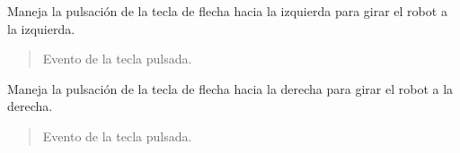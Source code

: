 \documentclass[a4paper,10pt,spanish]{sphinxmanual}
\begin{document}
\begin{fulllineitems}
\begin{fulllineitems}
\begin{quote}
\begin{description}
\end{description}\end{quote}

\end{fulllineitems}


\begin{fulllineitems}
\label{\detokenize{squad_state_manager:squad_state_manager.InterfazManager.on_arrow_left}}
\pysigstartsignatures
{}
\pysigstopsignatures
\sphinxAtStartPar
Maneja la pulsación de la tecla de flecha hacia la izquierda para girar el robot a la izquierda.
\begin{quote}\begin{description}
\sphinxAtStartPar
{} \textendash{} Evento de la tecla pulsada.

\end{description}\end{quote}

\end{fulllineitems}


\begin{fulllineitems}
\label{\detokenize{squad_state_manager:squad_state_manager.InterfazManager.on_arrow_right}}
\pysigstartsignatures
{}
\pysigstopsignatures
\sphinxAtStartPar
Maneja la pulsación de la tecla de flecha hacia la derecha para girar el robot a la derecha.
\begin{quote}\begin{description}
\sphinxAtStartPar
{} \textendash{} Evento de la tecla pulsada.

\end{description}\end{quote}

\end{fulllineitems}


\end{fulllineitems}
\end{document}
